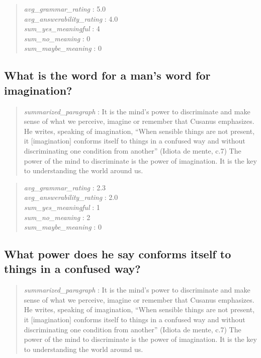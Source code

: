 \begin{quote}
\emph{avg\_grammar\_rating} : 5.0\\
\emph{avg\_answerability\_rating} : 4.0\\
\emph{sum\_yes\_meaningful} : 4\\
\emph{sum\_no\_meaning} : 0\\
\emph{sum\_maybe\_meaning} : 0
\end{quote}

\hypertarget{what-is-the-word-for-a-mans-word-for-imagination}{%
\subsection{What is the word for a man's word for
imagination?}\label{what-is-the-word-for-a-mans-word-for-imagination}}

\begin{quote}
\emph{summarized\_paragraph} : It is the mind's power to discriminate
and make sense of what we perceive, imagine or remember that Cusanus
emphasizes. He writes, speaking of imagination, ``When sensible things
are not present, it {[}imagination{]} conforms itself to things in a
confused way and without discriminating one condition from another''
(Idiota de mente, c.7) The power of the mind to discriminate is the
power of imagination. It is the key to understanding the world around
us.
\end{quote}

\begin{quote}
\emph{avg\_grammar\_rating} : 2.3\\
\emph{avg\_answerability\_rating} : 2.0\\
\emph{sum\_yes\_meaningful} : 1\\
\emph{sum\_no\_meaning} : 2\\
\emph{sum\_maybe\_meaning} : 0
\end{quote}

\hypertarget{what-power-does-he-say-conforms-itself-to-things-in-a-confused-way}{%
\subsection{What power does he say conforms itself to things in a
confused
way?}\label{what-power-does-he-say-conforms-itself-to-things-in-a-confused-way}}

\begin{quote}
\emph{summarized\_paragraph} : It is the mind's power to discriminate
and make sense of what we perceive, imagine or remember that Cusanus
emphasizes. He writes, speaking of imagination, ``When sensible things
are not present, it {[}imagination{]} conforms itself to things in a
confused way and without discriminating one condition from another''
(Idiota de mente, c.7) The power of the mind to discriminate is the
power of imagination. It is the key to understanding the world around
us.
\end{quote}

